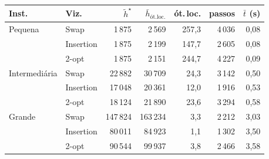\begin{tabular}{llrrrrr}
\toprule
Inst. & Viz. & $\tilde h^\star$ & $\bar h_{\text{ót.loc.}}$ & ót.\,loc. & passos & $\bar t$ (s) \\
\midrule
Pequena & Swap & 1\,875 & 2\,569 & 257{,}3 & 4\,036 & 0{,}08 \\
 & Insertion & 1\,875 & 2\,199 & 147{,}7 & 2\,605 & 0{,}08 \\
 & 2-opt & 1\,875 & 2\,151 & 244{,}7 & 4\,227 & 0{,}09 \\
\addlinespace
Intermediária & Swap & 22\,882 & 30\,709 & 24{,}3 & 3\,142 & 0{,}50 \\
 & Insertion & 17\,048 & 20\,361 & 12{,}0 & 1\,916 & 0{,}53 \\
 & 2-opt & 18\,124 & 21\,890 & 23{,}6 & 3\,294 & 0{,}58 \\
\addlinespace
Grande & Swap & 147\,824 & 163\,234 & 3{,}3 & 2\,212 & 3{,}03 \\
 & Insertion & 80\,011 & 84\,923 & 1{,}1 & 1\,302 & 3{,}50 \\
 & 2-opt & 90\,544 & 99\,937 & 3{,}8 & 2\,466 & 3{,}58 \\
\bottomrule
\end{tabular}
